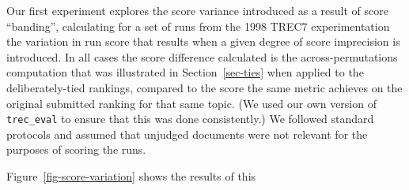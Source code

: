 Our first experiment explores the score variance introduced as a
result of score ``banding'', calculating for a set of runs from the
1998 TREC7 experimentation the variation in run score that results
when a given degree of score imprecision is introduced.
In all cases the score difference calculated is the
across-permutations computation that was illustrated in
Section~\ref{sec-ties} when applied to the deliberately-tied
rankings, compared to the score the same metric achieves on the
original submitted ranking for that same topic.
(We used our own version of {\tt{trec\_eval}} to ensure that this was
done consistently.)
We followed standard protocols and assumed that unjudged documents
were not relevant for the purposes of scoring the runs.

Figure~\ref{fig-score-variation} shows the results of this
{}

